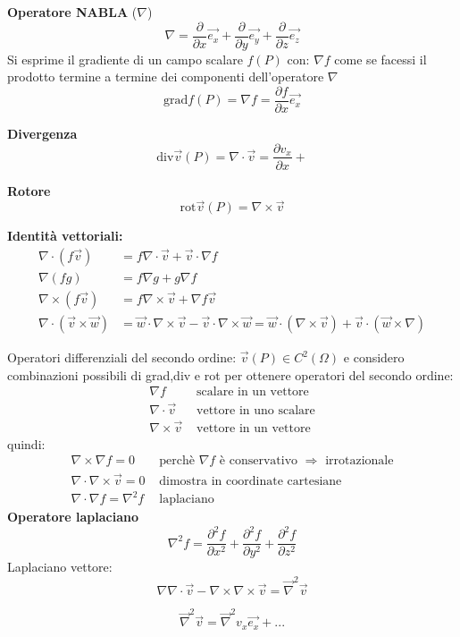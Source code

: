 \textbf{Operatore NABLA} ($\nabla$)
$$
\nabla = \frac{\partial}{\partial x}\vec{e_x} + \frac{\partial}{\partial y}\vec{e_y} + \frac{\partial}{\partial z}\vec{e_z}
$$
Si esprime il gradiente di un campo scalare $f(P)$ con: $\nabla f$ come se facessi il prodotto
termine a termine dei componenti dell'operatore $\nabla$
$$
\text{grad} f(P) = \nabla f = \frac{\partial f}{\partial x}\vec{e_x}
$$

\textbf{Divergenza}
$$
\text{div}\vec{v}(P) = \nabla\cdot\vec{v} = \frac{\partial v_x}{\partial x} + 
$$

\textbf{Rotore}
$$
\text{rot}\vec{v}(P) = \nabla \times \vec{v}
$$

\textbf{Identità vettoriali:}
\begin{align*}
\nabla\cdot(f\vec{v}) &= f\nabla\cdot\vec{v} + \vec{v}\cdot \nabla f \\
\nabla(f g) &= f\nabla g + g\nabla f \\
\nabla \times (f\vec{v}) &= f\nabla\times\vec{v} + \nabla f \vec{v} \\
\nabla\cdot (\vec{v}\times\vec{w}) &= \vec{w}\cdot\nabla\times\vec{v} - \vec{v}\cdot\nabla\times\vec{w}
= \vec{w}\cdot(\nabla\times\vec{v}) + \vec{v}\cdot (\vec{w}\times\nabla)
\end{align*}

Operatori differenziali del secondo ordine:
$ \vec{v}(P) \in C^2(\Omega) $ e considero combinazioni possibili di grad,div e rot per ottenere
operatori del secondo ordine:
\begin{align*}
\nabla f &\text{ scalare in un vettore}\\
\nabla\cdot\vec{v} &\text{ vettore in uno scalare}\\
\nabla\times\vec{v} &\text{ vettore in un vettore}
\end{align*}
quindi:
\begin{align*}
\nabla\times\nabla f = 0 &\text{ perchè $\nabla f$ è conservativo $\Rightarrow$ irrotazionale}\\
\nabla\cdot\nabla\times\vec{v} = 0 &\text{ dimostra in coordinate cartesiane}\\
\nabla\cdot \nabla f = \nabla^2 f &\text{ laplaciano}
\end{align*}
\textbf{Operatore laplaciano}
$$
\nabla^2 f = \frac{\partial^2f}{\partial x^2} + \frac{\partial^2f}{\partial y^2} + \frac{\partial^2f}{\partial z^2}
$$
Laplaciano vettore:
$$
\nabla\nabla\cdot\vec{v} - \nabla\times\nabla\times\vec{v} = \vec{\nabla}^2\vec{v}
$$

$$
\vec{\nabla}^2\vec{v} = \vec{\nabla}^2v_x\vec{e_x} + ...
$$

